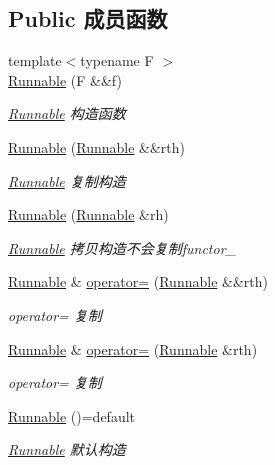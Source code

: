 \subsection*{Public 成员函数}
\begin{DoxyCompactItemize}
\item 
{\footnotesize template$<$typename F $>$ }\\\hyperlink{classRunnable_ab052afa8b53dd1e7c28e978962839446}{Runnable} (F \&\&f)
\begin{DoxyCompactList}\small\item\em \hyperlink{classRunnable}{Runnable} 构造函数 \end{DoxyCompactList}\item 
\hyperlink{classRunnable_ab2054720a62d059c59d0e8085d3be78e}{Runnable} (\hyperlink{classRunnable}{Runnable} \&\&rth)
\begin{DoxyCompactList}\small\item\em \hyperlink{classRunnable}{Runnable} 复制构造 \end{DoxyCompactList}\item 
\hyperlink{classRunnable_a9e4d88b5d30d6e0368c5d22a0df203ee}{Runnable} (\hyperlink{classRunnable}{Runnable} \&rh)
\begin{DoxyCompactList}\small\item\em \hyperlink{classRunnable}{Runnable} 拷贝构造不会复制functor\+\_\+ \end{DoxyCompactList}\item 
\hyperlink{classRunnable}{Runnable} \& \hyperlink{classRunnable_ab41eea27867a9f54e94255851412bc77}{operator=} (\hyperlink{classRunnable}{Runnable} \&\&rth)
\begin{DoxyCompactList}\small\item\em operator= 复制 \end{DoxyCompactList}\item 
\hyperlink{classRunnable}{Runnable} \& \hyperlink{classRunnable_a998834d5321cd0f014dd90f3f8785c02}{operator=} (\hyperlink{classRunnable}{Runnable} \&rth)
\begin{DoxyCompactList}\small\item\em operator= 复制 \end{DoxyCompactList}\item 
\mbox{\label{classRunnable_a5769222dcc4b2adca7723bfbdfa00cbb}} 
\hyperlink{classRunnable_a5769222dcc4b2adca7723bfbdfa00cbb}{Runnable} ()=default
\begin{DoxyCompactList}\small\item\em \hyperlink{classRunnable}{Runnable} 默认构造 \end{DoxyCompactList}\item 

\end{DoxyCompactItemize}
